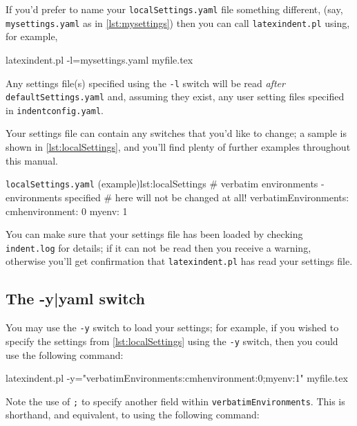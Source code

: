   If you'd prefer to name your \texttt{localSettings.yaml} file something different,
  (say, \texttt{mysettings.yaml} as in \cref{lst:mysettings}) then you can call
  \texttt{latexindent.pl} using, for example,

  \begin{commandshell}
latexindent.pl -l=mysettings.yaml myfile.tex
\end{commandshell}

  Any settings file(s) specified using the \texttt{-l} switch will be read \emph{after}
  \texttt{defaultSettings.yaml} and, assuming they exist, any user setting files
  specified in \texttt{indentconfig.yaml}.

  Your settings file can contain any switches that you'd like to change; a sample is
  shown in \cref{lst:localSettings}, and you'll find plenty of further examples
  throughout this manual. 

  \begin{yaml}{\texttt{localSettings.yaml} (example)}{lst:localSettings}
#  verbatim environments - environments specified
#  here will not be changed at all!
verbatimEnvironments:
    cmhenvironment: 0
    myenv: 1
\end{yaml}

  You can make sure that your settings file has been loaded by checking
  \texttt{indent.log} for details; if it can not be read then you receive a warning,
  otherwise you'll get confirmation that \texttt{latexindent.pl} has read your settings
  file.

 \subsection{The -y|yaml switch}\label{sec:yamlswitch}
  You%
  may use the \texttt{-y} switch to load your settings;  for example, if you wished to
  specify the settings from \cref{lst:localSettings} using the \texttt{-y} switch, then you
  could use the following command:

  \begin{commandshell}
latexindent.pl -y="verbatimEnvironments:cmhenvironment:0;myenv:1" myfile.tex
\end{commandshell}

  Note the use of \texttt{;} to specify another field within
  \texttt{verbatimEnvironments}. This is shorthand, and equivalent, to using the
  following command: 

